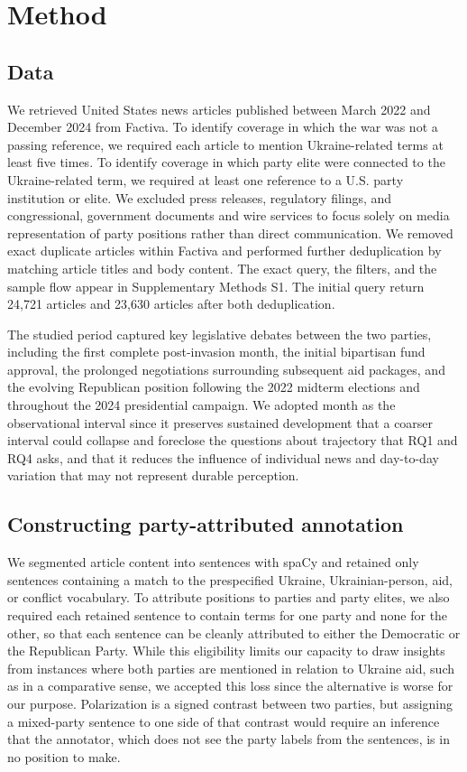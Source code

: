 \section{Method}


\subsection{Data}

We retrieved United States news articles published between March 2022 and December 2024 from Factiva. To identify coverage in which the war was not a passing reference, we required each article to mention Ukraine-related terms at least five times. To identify coverage in which party elite were connected to the Ukraine-related term, we required at least one reference to a U.S. party institution or elite. We excluded press releases, regulatory filings, and congressional, government documents and wire services to focus solely on media representation of party positions rather than direct communication. We removed exact duplicate articles within Factiva and performed further deduplication by matching article titles and body content. The exact query, the filters, and the sample flow appear in Supplementary Methods S1. The initial query return 24,721 articles and 23,630 articles after both deduplication.

The studied period captured key legislative debates between the two parties, including the first complete post-invasion month, the initial bipartisan fund approval, the prolonged negotiations surrounding subsequent aid packages, and the evolving Republican position following the 2022 midterm elections and throughout the 2024 presidential campaign. We adopted month as the observational interval since it preserves sustained development that a coarser interval could collapse and foreclose the questions about trajectory that RQ1 and RQ4 asks, and that it reduces the influence of individual news and day-to-day variation that may not represent durable perception.

\subsection{Constructing party-attributed annotation}

We segmented article content into sentences with spaCy \citep{honnibalSpaCyIndustrialstrengthNatural2020} and retained only sentences containing a match to the prespecified Ukraine, Ukrainian-person, aid, or conflict vocabulary. To attribute positions to parties and party elites, we also required each retained sentence to contain terms for one party and none for the other, so that each sentence can be cleanly attributed to either the Democratic or the Republican Party. While this eligibility limits our capacity to draw insights from instances where both parties are mentioned in relation to Ukraine aid, such as in a comparative sense, we accepted this loss since the alternative is worse for our purpose. Polarization is a signed contrast between two parties, but assigning a mixed-party sentence to one side of that contrast would require an inference that the annotator, which does not see the party labels from the sentences, is in no position to make.

